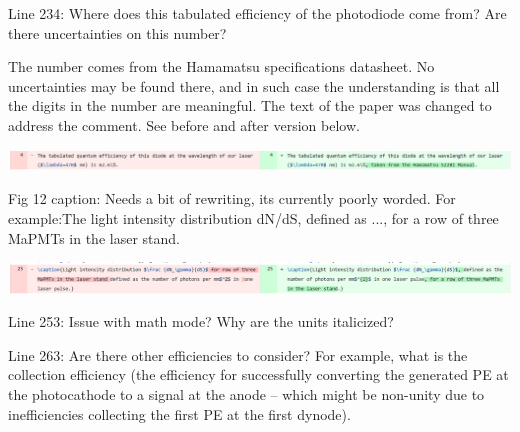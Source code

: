 \documentclass[11pt]{report}
\begin{document}
\begin{tcolorbox}[enlarge top by=2em,colbacktitle=black!60!white,colframe=black!80!white,left=0pt,right=0pt,top=0pt,bottom=0pt,boxrule=0.3pt,title=\bfseries1.03]
Line 234:  Where does this tabulated efficiency of the photodiode come from?  Are there uncertainties on this number?
\end{tcolorbox}

The number comes from the Hamamatsu specifications datasheet. No uncertainties may be found there, and in such case the understanding is that all the digits in the number are meaningful. The text of the paper was changed to address the comment. See before and after version below.


\includegraphics[width=\linewidth]{round1/1.03.png}

\begin{tcolorbox}[enlarge top by=2em,colbacktitle=black!60!white,colframe=black!80!white,left=0pt,right=0pt,top=0pt,bottom=0pt,boxrule=0.3pt,title=\bfseries1.04]
Fig  12  caption:  Needs  a  bit  of  rewriting,  its  currently  poorly  worded.   For  example:The light intensity distribution dN/dS, defined as ..., for a row of three MaPMTs in the laser stand.
\end{tcolorbox}


\includegraphics[width=\linewidth]{round1/1.04.png}

\begin{tcolorbox}[enlarge top by=2em,colbacktitle=black!60!white,colframe=black!80!white,left=0pt,right=0pt,top=0pt,bottom=0pt,boxrule=0.3pt,title=\bfseries1.05]
Line 253:  Issue with math mode?  Why are the units italicized?
\end{tcolorbox}


\begin{tcolorbox}[enlarge top by=2em,colbacktitle=black!60!white,colframe=black!80!white,left=0pt,right=0pt,top=0pt,bottom=0pt,boxrule=0.3pt,title=\bfseries1.06]
Line 263:  Are there other efficiencies to consider?  For example, what is the collection efficiency (the  efficiency  for  successfully  converting  the  generated  PE  at  the  photocathode  to  a  signal  at  the anode – which might be non-unity due to inefficiencies collecting the first PE at the first dynode).
\end{tcolorbox}
\end{document}
